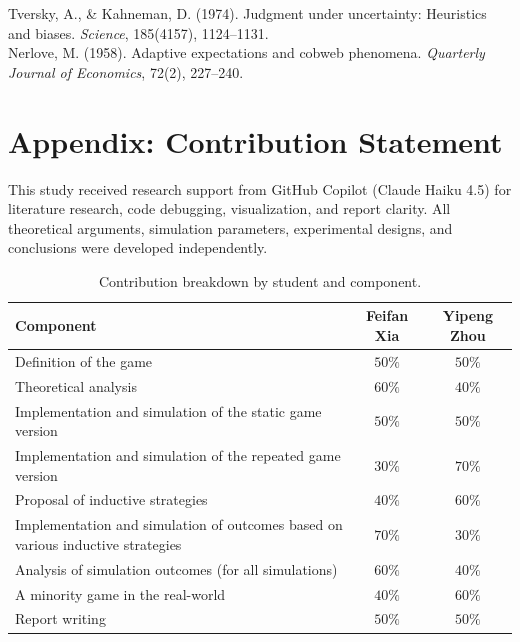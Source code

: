 Tversky, A., \& Kahneman, D. (1974). Judgment under uncertainty: Heuristics and biases. \textit{Science}, 185(4157), 1124--1131. \\

Nerlove, M. (1958). Adaptive expectations and cobweb phenomena. \textit{Quarterly Journal of Economics}, 72(2), 227--240. \\


\section*{Appendix: Contribution Statement}
This study received research support from GitHub Copilot (Claude Haiku 4.5) for literature research, code debugging, visualization, and report clarity. All theoretical arguments, simulation parameters, experimental designs, and conclusions were developed independently.

\begin{table}[b]
\centering
\small
\begin{tabular}{|p{12cm}|c|c|}
\hline
\textbf{Component} & \textbf{Feifan Xia} & \textbf{Yipeng Zhou} \\
\hline
Definition of the game & $50\%$ & $50\%$ \\
\hline
Theoretical analysis & $60\%$ & $40\%$ \\
\hline
Implementation and simulation of the static game version & $50\%$ & $50\%$ \\
\hline
Implementation and simulation of the repeated game version & $30\%$ & $70\%$ \\
\hline
Proposal of inductive strategies & $40\%$ & $60\%$ \\
\hline
Implementation and simulation of outcomes based on various inductive strategies & $70\%$ & $30\%$ \\
\hline
Analysis of simulation outcomes (for all simulations) & $60\%$ & $40\%$ \\
\hline
A minority game in the real-world & $40\%$ & $60\%$ \\
\hline
Report writing & $50\%$ & $50\%$ \\
\hline
\end{tabular}
\caption{Contribution breakdown by student and component.}
\end{table}\\

